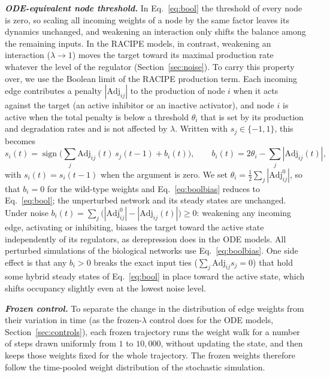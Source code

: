 \documentclass[11pt]{article}
\newcommand{\adj}{\mathrm{Adj}}
\begin{document}
\noindent\textbf{\textit{ODE-equivalent node threshold.}} In Eq.~\ref{eq:bool} the threshold of every node is zero, so scaling all incoming weights of a node by the same factor leaves its dynamics unchanged, and weakening an interaction only shifts the balance among the remaining inputs. In the RACIPE models, in contrast, weakening an interaction ($\lambda \to 1$) moves the target toward its maximal production rate whatever the level of the regulator (Section~\ref{sec:noise}). To carry this property over, we use the Boolean limit of the RACIPE production term. Each incoming edge contributes a penalty $|\adj_{ij}|$ to the production of node $i$ when it acts against the target (an active inhibitor or an inactive activator), and node $i$ is active when the total penalty is below a threshold $\theta_i$ that is set by its production and degradation rates and is not affected by $\lambda$. Written with $s_j \in \{-1,1\}$, this becomes
\begin{equation} \label{eq:boolbias}
    s_i(t) = \operatorname{sign}\Big(\sum_j \adj_{ij}(t)\, s_j(t-1) + b_i(t)\Big), \qquad b_i(t) = 2\theta_i - \sum_j |\adj_{ij}(t)|,
\end{equation}
with $s_i(t) = s_i(t-1)$ when the argument is zero. We set $\theta_i = \tfrac12\sum_j |\adj^{0}_{ij}|$, so that $b_i = 0$ for the wild-type weights and Eq.~\ref{eq:boolbias} reduces to Eq.~\ref{eq:bool}; the unperturbed network and its steady states are unchanged. Under noise $b_i(t) = \sum_j \big(|\adj^{0}_{ij}| - |\adj_{ij}(t)|\big) \ge 0$: weakening any incoming edge, activating or inhibiting, biases the target toward the active state independently of its regulators, as derepression does in the ODE models. All perturbed simulations of the biological networks use Eq.~\ref{eq:boolbias}. One side effect is that any $b_i > 0$ breaks the exact input ties ($\sum_j \adj_{ij} s_j = 0$) that hold some hybrid steady states of Eq.~\ref{eq:bool} in place toward the active state, which shifts occupancy slightly even at the lowest noise level.

\noindent\textbf{\textit{Frozen control.}} To separate the change in the distribution of edge weights from their variation in time (as the frozen-$\lambda$ control does for the ODE models, Section~\ref{sec:controls}), each frozen trajectory runs the weight walk for a number of steps drawn uniformly from $1$ to $10{,}000$, without updating the state, and then keeps those weights fixed for the whole trajectory. The frozen weights therefore follow the time-pooled weight distribution of the stochastic simulation.
\end{document}
